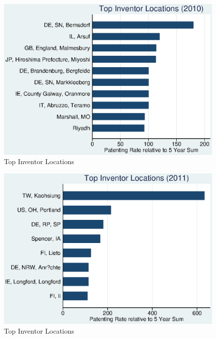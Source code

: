 \documentclass[12pt]{article}
\begin{document}
\begin{figure}[h]
\begin{centering}
  \includegraphics{r52010top10}
  \caption{Top Inventor Locations}
  \label{fig:r52010top10}
\end{centering}
\end{figure}

\begin{figure}[h]
\begin{centering}
  \includegraphics{r52011top10}
  \caption{Top Inventor Locations}
  \label{fig:r52011top10}
\end{centering}
\end{figure}
\end{document}
